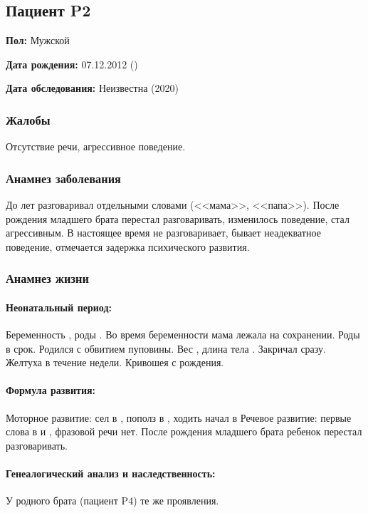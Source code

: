 \documentclass[a4paper,14pt]{extarticle}
\newcommand{\gramm}{г}
\newcommand{\cm}{см}
\newcommand{\months}{мес.}
\begin{document}
\newpage
\subsection*{Пациент P2}

\textbf{Пол:} Мужской

\textbf{Дата рождения:} 07.12.2012 ()

\textbf{Дата обследования:} Неизвестна (2020)

\subsubsection*{Жалобы}

Отсутствие речи, агрессивное поведение.

\subsubsection*{Анамнез заболевания}

До  лет разговаривал отдельными словами (<<мама>>, <<папа>>).
После рождения младшего брата перестал разговаривать, изменилось поведение, стал агрессивным. 
В настоящее время не разговаривает, бывает неадекватное поведение, отмечается задержка психического развития.

\subsubsection*{Анамнез жизни}

\paragraph{Неонатальный период:} Беременность , роды .
Во время беременности мама лежала на сохранении. Роды в срок. Родился с обвитием пуповины.
Вес \numprint[\gramm]{3710}, длина тела \numprint[\cm]{54}. Закричал сразу. Желтуха в течение недели. Кривошея с рождения.

\paragraph{Формула развития:} Моторное развитие: сел в \numprint[\months]{9}, пополз в \numprint[\months]{8}, ходить начал в \numprint[\months]{10}
Речевое развитие: первые слова в  и \numprint[\months]{3}, фразовой речи нет. После рождения младшего брата ребенок перестал разговаривать. 

\paragraph{Генеалогический анализ и наследственность:} У родного брата (пациент P4) те же проявления.
\end{document}

